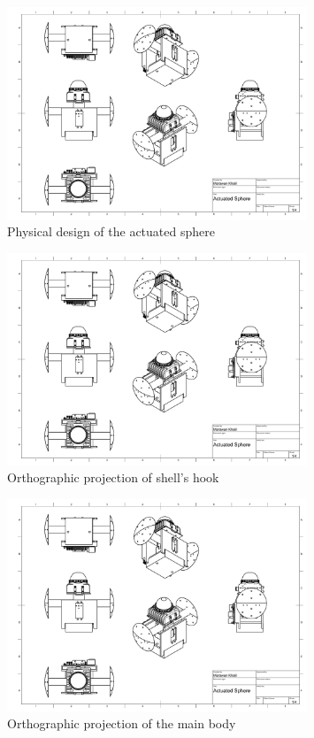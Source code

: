 \documentclass[english, bachelor, utf8]{base/thesis_telematics}
\begin{document}
\begin{figure}
\centering
\includegraphics[width=0.80\textwidth,page=1]{pics/Actuated_Sphere_Drawing.pdf}
\caption{Physical design of the actuated sphere}
\label{fig:act_system_page1}
\end{figure}

\begin{figure}[H]
\centering
\includegraphics[width=0.80\textwidth,page=2]{pics/Actuated_Sphere_Drawing.pdf}
\caption{Orthographic projection of shell's hook}
\label{fig:act_system_page2}
\end{figure}

\begin{figure}[H]
\centering
\includegraphics[width=0.80\textwidth,page=3]{pics/Actuated_Sphere_Drawing.pdf}
\caption{Orthographic projection of the main body}
\label{fig:act_system_page3}
\end{figure}
\end{document}
